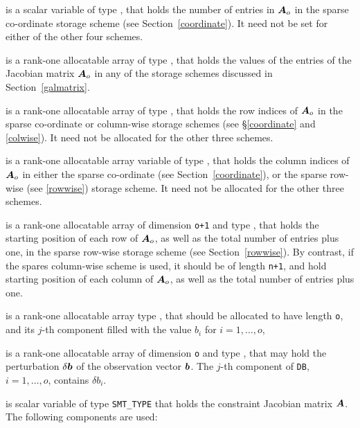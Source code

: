 \documentclass{galahad}
\begin{document}
\begin{description}
\begin{description}
 is a scalar variable of type \integer, that 
holds the number of entries in ${\bm{A}}_o$
in the sparse co-ordinate storage scheme (see Section~\ref{coordinate}). 
It need not be set for either of the other four schemes.

 is a rank-one allocatable array of type \realdp, that 
holds
the values of the entries of the Jacobian matrix ${\bm{A}}_o$ in any of the 
storage schemes discussed in Section~\ref{galmatrix}.

 is a rank-one allocatable array of type \integer,
that holds the row indices of ${\bm{A}}_o$ in the sparse co-ordinate 
or column-wise storage schemes (see \S\ref{coordinate} and \ref{colwise}).
It need not be allocated for the other three schemes.

 is a rank-one allocatable array variable of type \integer,
that holds the column indices of ${\bm{A}}_o$ in either the sparse co-ordinate 
(see Section~\ref{coordinate}), or the sparse row-wise 
(see \ref{rowwise}) storage scheme.
It need not be allocated for the other three schemes.

 is a rank-one allocatable array of dimension {\tt o+1} and type 
\integer, that holds the 
starting position of each row of ${\bm{A}}_o$, as well
as the total number of entries plus one, in the sparse row-wise storage
scheme (see Section~\ref{rowwise}). By contrast, if the spares column-wise 
scheme is used, it should be of length {\tt n+1}, and hold
starting position of each column of ${\bm{A}}_o$, as well
as the total number of entries plus one.
\end{description}

 is a rank-one allocatable array type \realdp, that 
should be allocated to have length {\tt o}, and its $j$-th component 
filled with the value $b_{i}$ for $i = 1, \ldots , o$, 

 is a rank-one allocatable array of dimension {\tt o} and type 
\realdp, that may hold the perturbation $\delta {\bm{b}}$ 
of the observation vector ${\bm{b}}$.
The $j$-th component of 
{\tt DB}, $i = 1,  \ldots ,  o$, contains $\delta b_{i}$.

 is scalar variable of type {\tt SMT\_TYPE} that holds the constraint 
Jacobian matrix ${\bm{A}}$. The following components are used:

\begin{description}


\end{description}
\end{description}
\end{document}
